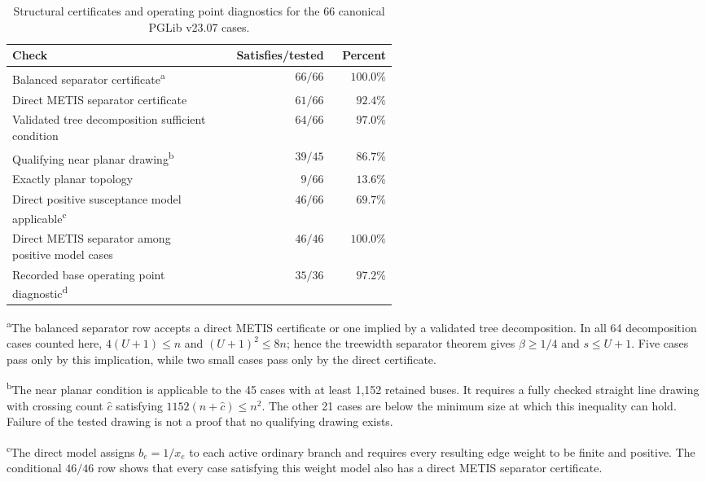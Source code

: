 \begin{table}[!t]
  \centering
  \caption{Structural certificates and operating point diagnostics for the
    66 canonical PGLib v23.07 cases.}
  \label{tab:pglib-corpus-summary}
  \begin{tabular}{@{}p{0.55\linewidth}rr@{}}
    \toprule
    Check & Satisfies/tested & Percent \\
    \midrule
    Balanced separator certificate\textsuperscript{a}
      & $66/66$ & $100.0\%$ \\
    Direct METIS separator certificate
      & $61/66$ & $92.4\%$ \\
    Validated tree decomposition sufficient condition
      & $64/66$ & $97.0\%$ \\
    Qualifying near planar drawing\textsuperscript{b}
      & $39/45$ & $86.7\%$ \\
    Exactly planar topology
      & $9/66$ & $13.6\%$ \\
    Direct positive susceptance model applicable\textsuperscript{c}
      & $46/66$ & $69.7\%$ \\
    Direct METIS separator among positive model cases
      & $46/46$ & $100.0\%$ \\
    Recorded base operating point diagnostic\textsuperscript{d}
      & $35/36$ & $97.2\%$ \\
    \bottomrule
  \end{tabular}

  \vspace{0.45em}
  \begin{minipage}{0.92\linewidth}
    \footnotesize
    \textsuperscript{a}The balanced separator row accepts a direct METIS
    certificate or one implied by a validated tree decomposition.  In all 64
    decomposition cases counted here, $4(U+1)\leq n$ and
    $(U+1)^2\leq8n$; hence the treewidth separator theorem gives
    $\beta\geq1/4$ and $s\leq U+1$.  Five cases pass only by this implication,
    while two small cases pass only by the direct certificate.

    \smallskip
    \textsuperscript{b}The near planar condition is applicable to the
    45 cases with at least 1,152 retained buses.  It requires a fully checked
    straight line drawing with crossing count $\widehat c$ satisfying
    $1152(n+\widehat c)\leq n^2$.  The other 21 cases are below the minimum
    size at which this inequality can hold.  Failure of the tested drawing is
    not a proof that no qualifying drawing exists.

    \smallskip
    \textsuperscript{c}The direct model assigns $b_e=1/x_e$ to each active
    ordinary branch and requires every resulting edge weight to be finite and
    positive.  The conditional $46/46$ row shows that every case satisfying
    this weight model also has a direct METIS separator certificate.


\end{minipage}
\end{table}
